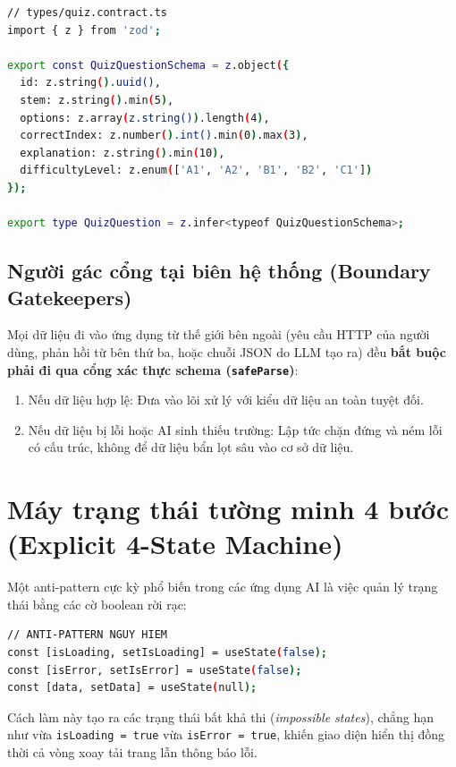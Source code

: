 \documentclass[a4paper,11pt]{article}
\begin{document}
\begin{lstlisting}[language=bash, caption={Ví dụ hợp đồng dữ liệu bất biến bằng Zod và TypeScript}]
// types/quiz.contract.ts
import { z } from 'zod';

export const QuizQuestionSchema = z.object({
  id: z.string().uuid(),
  stem: z.string().min(5),
  options: z.array(z.string()).length(4),
  correctIndex: z.number().int().min(0).max(3),
  explanation: z.string().min(10),
  difficultyLevel: z.enum(['A1', 'A2', 'B1', 'B2', 'C1'])
});

export type QuizQuestion = z.infer<typeof QuizQuestionSchema>;
\end{lstlisting}

\subsection{Người gác cổng tại biên hệ thống (Boundary Gatekeepers)}
Mọi dữ liệu đi vào ứng dụng từ thế giới bên ngoài (yêu cầu HTTP của người dùng, phản hồi từ bên thứ ba, hoặc chuỗi JSON do LLM tạo ra) đều \textbf{bắt buộc phải đi qua cổng xác thực schema (\texttt{safeParse})}:
\begin{enumerate}[label={\arabic*.}]
    \item Nếu dữ liệu hợp lệ: Đưa vào lõi xử lý với kiểu dữ liệu an toàn tuyệt đối.
    \item Nếu dữ liệu bị lỗi hoặc AI sinh thiếu trường: Lập tức chặn đứng và ném lỗi có cấu trúc, không để dữ liệu bẩn lọt sâu vào cơ sở dữ liệu.
\end{enumerate}

\section{Máy trạng thái tường minh 4 bước (Explicit 4-State Machine)}

Một anti-pattern cực kỳ phổ biến trong các ứng dụng AI là việc quản lý trạng thái bằng các cờ boolean rời rạc:
\begin{lstlisting}[language=bash]
// ANTI-PATTERN NGUY HIEM
const [isLoading, setIsLoading] = useState(false);
const [isError, setIsError] = useState(false);
const [data, setData] = useState(null);
\end{lstlisting}

Cách làm này tạo ra các trạng thái bất khả thi (\textit{impossible states}), chẳng hạn như vừa \texttt{isLoading = true} vừa \texttt{isError = true}, khiến giao diện hiển thị đồng thời cả vòng xoay tải trang lẫn thông báo lỗi.
\end{document}
